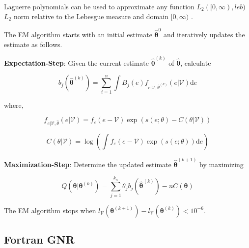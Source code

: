 \documentclass[
  12pt]{article}
\theoremstyle{definition}
\theoremstyle{remark}
\begin{document}
Laguerre polynomials can be used to approximate any function
\(L_2([0,\infty), leb)\) \(L_2\) norm relative to the Lebesgue measure
and domain \([0,\infty)\) \citep{Chen2007}.

The EM algorithm \citep{Kang2021} starts with an initial estimate
\(\hat{\mathbf{\theta}}^0\) and iteratively updates the estimate as
follows.

\textbf{Expectation-Step}: Given the current estimate
\(\hat{\mathbf{\theta}}^{(k)}\) of \(\hat{\mathbf{\theta}}\), calculate

\[
 b_j \left(\hat{\mathbf{\theta}}^{(k)}\right) = \sum_{i=1}^{n}\int B_j(e)f_{e|\mathcal{V},\hat{\theta}^{(k)}}(e|\mathcal{V})\text{d}e
\]

where,

\[
f_{e|\mathcal{V},\hat{\theta}}(e|\mathcal{V}) = f_{\varepsilon}(e-\mathcal{V})\exp(s(e;\theta)-C(\theta|\mathcal{V}))
\]

\[
C(\theta|\mathcal{V})=\log\left(\int f_{\varepsilon}(e-\mathcal{V})\exp(s(e;\theta))\text{d}e\right)
\]

\textbf{Maximization-Step}: Determine the updated estimate
\(\hat{\mathbf{\theta}}^{(k+1)}\) by maximizing

\[
Q(\mathbf{\theta}|\mathbf{\theta}^{(k)}) = \sum_{j=1}^{k_n}\theta_j b_j \left(\hat{\mathbf{\theta}}^{(k)}\right) - nC(\mathbf{\theta})
\]

The EM algorithm stops when
\(l_{\mathcal{V}}(\mathbf{\theta}^{(k+1)})-l_{\mathcal{V}}(\mathbf{\theta}^{(k)})<10^{-6}\).

\subsection{Fortran GNR}\label{fortran-gnr}

\begin{table}

\caption{\label{tbl-CD-Stata-Fortran}Cobb-Douglas production function
parameters estimates using GNR Stata data and estimator vs.~the Fortran
GNR estimator.}


\end{table}%
\end{document}
